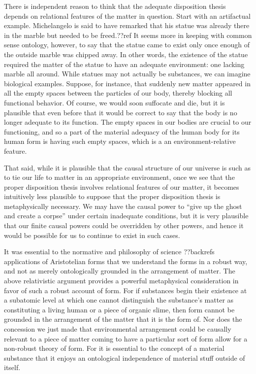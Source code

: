 There is independent reason to think that the adequate disposition thesis depends on relational features of the matter in 
question. Start with an artifactual example. Michelangelo is said to have remarked that his statue was already there in the 
marble but needed to be freed.??ref It seems more in keeping with common sense ontology, however, to say that the statue came 
to exist only once enough of the outside marble was chipped away. In other words, the existence of the statue required the 
matter of the statue to have an adequate environment: one lacking marble all around. While statues may not actually be substances,
we can imagine biological examples. Suppose, for instance, that suddenly new matter appeared in all the empty spaces between the particles of our body, thereby blocking all functional behavior. Of course, we would soon suffocate and die, but it is plausible
that even before that it would be correct to say that the body is no longer adequate to its function. The empty spaces
in our bodies are crucial to our functioning, and so a part of the material adequacy of the human body for its human form 
is having such empty spaces, which is a an environment-relative feature.

That said, while it is plausible that the causal structure of our universe is such as to tie our life to matter in an
appropriate environment, once we see that the proper disposition thesis involves relational features of our matter, it 
becomes intuitively less plausible to suppose that the proper disposition thesis is metaphysically necessary. We may have 
the causal power to ``give up the ghost and create a corpse'' under certain inadequate conditions, but it is very plausible
that our finite causal powers could be overridden by other powers, and hence it would be possible for us to continue to 
exist in such cases. 

It was essential to the normative and philosophy of science ??backrefs applications of Aristotelian forms that we understand
the forms in a robust way, and not as merely ontologically grounded in the arrangement of matter. The above relativistic argument provides a powerful metaphysical consideration in favor of such a robust account of form. For if substances begin their existence
at a subatomic level at which one cannot distinguish the substance's matter as constituting a living human or a piece of organic
slime, then form cannot be grounded in the arrangement of the matter that it is the form of. Nor does the concession we just 
made that environmental arrangement could be causally relevant to a piece of matter coming to have a particular sort of form 
allow for a non-robust theory of form. For it is essential to the concept of a material substance that it enjoys an ontological 
independence of material stuff outside of itself. 

